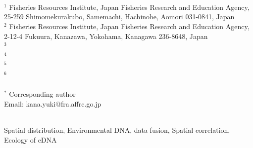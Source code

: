 \documentclass[12pt]{article}
\begin{document}
\setcounter{page}{1}
\renewcommand\citeleft{(} 
\renewcommand\citeright{)}

\\
\\
\ \\
$^{1}$ Fisheries Resources Institute, Japan Fisheries Research and Education Agency, 25-259 Shimomekurakubo, Samemachi, Hachinohe, Aomori 031-0841, Japan\\
$^{2}$ Fisheries Resources Institute, Japan Fisheries Research and Education Agency, 2-12-4 Fukuura, Kanazawa, Yokohama, Kanagawa 236-8648, Japan\\
$^{3}$ \\
$^{4}$ \\
$^{5}$ \\
$^{6}$ \\
\ \\

$^{\ast}$ Corresponding author\\
Email: kana.yuki@fra.affrc.go.jp

\newpage
{}

\\
Spatial distribution, Environmental DNA, data fusion, Spatial correlation, Ecology of eDNA
\end{document}
